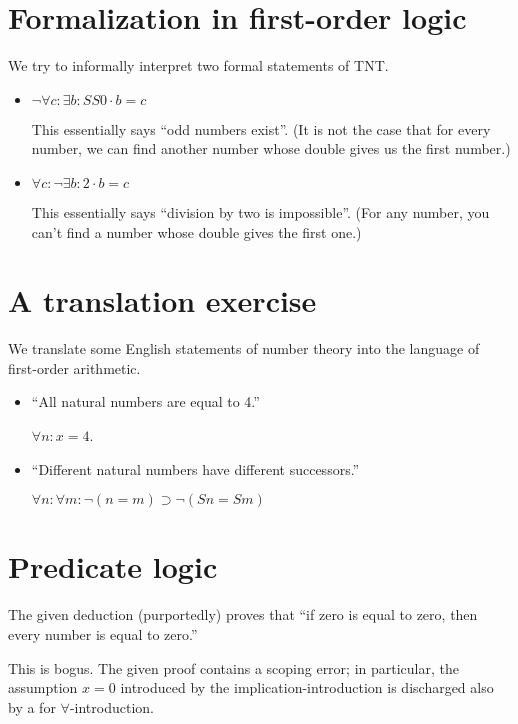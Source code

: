 \documentclass[11pt,letterpaper]{article}
\renewcommand{\implies}{\supset}
\begin{document}
\section{Formalization in first-order logic}

We try to informally interpret two formal statements of TNT.

\begin{itemize}
  \item
    $\neg \forall c : \exists b : SS0 \cdot b = c$

    This essentially says ``odd numbers exist''.
    (It is not the case that for every number, we can find another number whose
    double gives us the first number.)

  \item
    $\forall c : \neg \exists b : 2 \cdot b = c$

    This essentially says ``division by two is impossible''.
    (For any number, you can't find a number whose double gives the first one.)
\end{itemize}

\section{A translation exercise}

We translate some English statements of number theory into the language of
first-order arithmetic.

\begin{itemize}
  \item
    ``All natural numbers are equal to 4.''

    $\forall n: x = 4$.

  \item
    ``Different natural numbers have different successors.''

    $\forall n: \forall m: \neg(n = m) \implies \neg (S n = S m)$
\end{itemize}

\section{Predicate logic}

The given deduction (purportedly) proves that ``if zero is equal to zero, then
every number is equal to zero.''

This is bogus. The given proof contains a scoping error; in particular, the
assumption $x = 0$ introduced by the implication-introduction is discharged
also by a for $\forall$-introduction.
\end{document}
